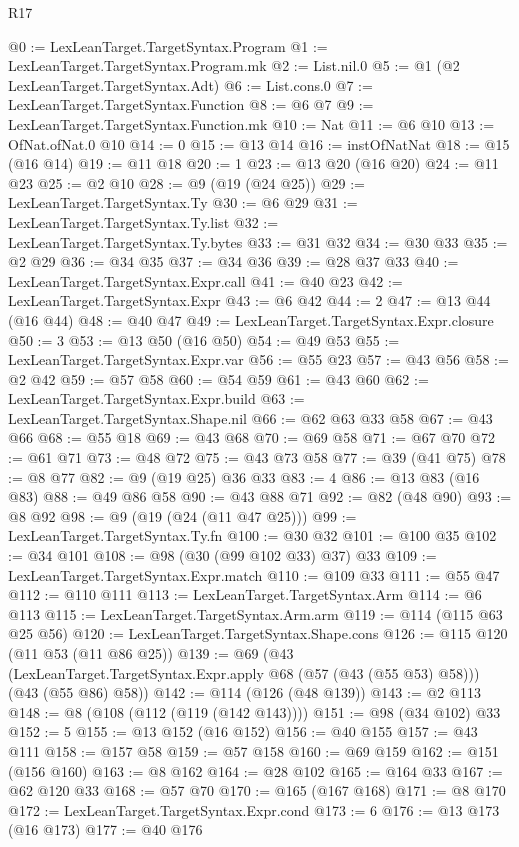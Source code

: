 \begin{lexlean}{R17}
\begin{coremodule}
{{{{{{{{{{{{{{{{{{{@0 := LexLeanTarget.TargetSyntax.Program
@1 := LexLeanTarget.TargetSyntax.Program.mk
@2 := List.nil.{0}
@5 := @1 (@2 LexLeanTarget.TargetSyntax.Adt)
@6 := List.cons.{0}
@7 := LexLeanTarget.TargetSyntax.Function
@8 := @6 @7
@9 := LexLeanTarget.TargetSyntax.Function.mk
@10 := Nat
@11 := @6 @10
@13 := OfNat.ofNat.{0} @10
@14 := 0
@15 := @13 @14
@16 := instOfNatNat
@18 := @15 (@16 @14)
@19 := @11 @18
@20 := 1
@23 := @13 @20 (@16 @20)
@24 := @11 @23
@25 := @2 @10
@28 := @9 (@19 (@24 @25))
@29 := LexLeanTarget.TargetSyntax.Ty
@30 := @6 @29
@31 := LexLeanTarget.TargetSyntax.Ty.list
@32 := LexLeanTarget.TargetSyntax.Ty.bytes
@33 := @31 @32
@34 := @30 @33
@35 := @2 @29
@36 := @34 @35
@37 := @34 @36
@39 := @28 @37 @33
@40 := LexLeanTarget.TargetSyntax.Expr.call
@41 := @40 @23
@42 := LexLeanTarget.TargetSyntax.Expr
@43 := @6 @42
@44 := 2
@47 := @13 @44 (@16 @44)
@48 := @40 @47
@49 := LexLeanTarget.TargetSyntax.Expr.closure
@50 := 3
@53 := @13 @50 (@16 @50)
@54 := @49 @53
@55 := LexLeanTarget.TargetSyntax.Expr.var
@56 := @55 @23
@57 := @43 @56
@58 := @2 @42
@59 := @57 @58
@60 := @54 @59
@61 := @43 @60
@62 := LexLeanTarget.TargetSyntax.Expr.build
@63 := LexLeanTarget.TargetSyntax.Shape.nil
@66 := @62 @63 @33 @58
@67 := @43 @66
@68 := @55 @18
@69 := @43 @68
@70 := @69 @58
@71 := @67 @70
@72 := @61 @71
@73 := @48 @72
@75 := @43 @73 @58
@77 := @39 (@41 @75)
@78 := @8 @77
@82 := @9 (@19 @25) @36 @33
@83 := 4
@86 := @13 @83 (@16 @83)
@88 := @49 @86 @58
@90 := @43 @88 @71
@92 := @82 (@48 @90)
@93 := @8 @92
@98 := @9 (@19 (@24 (@11 @47 @25)))
@99 := LexLeanTarget.TargetSyntax.Ty.fn
@100 := @30 @32
@101 := @100 @35
@102 := @34 @101
@108 := @98 (@30 (@99 @102 @33) @37) @33
@109 := LexLeanTarget.TargetSyntax.Expr.match
@110 := @109 @33
@111 := @55 @47
@112 := @110 @111
@113 := LexLeanTarget.TargetSyntax.Arm
@114 := @6 @113
@115 := LexLeanTarget.TargetSyntax.Arm.arm
@119 := @114 (@115 @63 @25 @56)
@120 := LexLeanTarget.TargetSyntax.Shape.cons
@126 := @115 @120 (@11 @53 (@11 @86 @25))
@139 := @69
    (@43 (LexLeanTarget.TargetSyntax.Expr.apply @68 (@57 (@43 (@55 @53) @58))) (@43 (@55 @86) @58))
@142 := @114 (@126 (@48 @139))
@143 := @2 @113
@148 := @8 (@108 (@112 (@119 (@142 @143))))
@151 := @98 (@34 @102) @33
@152 := 5
@155 := @13 @152 (@16 @152)
@156 := @40 @155
@157 := @43 @111
@158 := @157 @58
@159 := @57 @158
@160 := @69 @159
@162 := @151 (@156 @160)
@163 := @8 @162
@164 := @28 @102
@165 := @164 @33
@167 := @62 @120 @33
@168 := @57 @70
@170 := @165 (@167 @168)
@171 := @8 @170
@172 := LexLeanTarget.TargetSyntax.Expr.cond
@173 := 6
@176 := @13 @173 (@16 @173)
@177 := @40 @176
}}}}}}}}}}}}}}}}}}}
\end{coremodule}
\end{lexlean}
